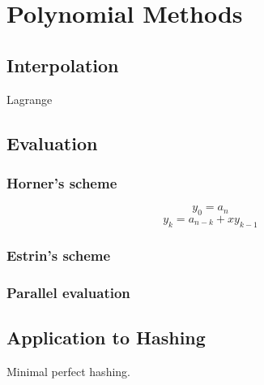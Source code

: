 
\chapter{Polynomial Methods}

\section{Interpolation}
Lagrange 
\section{Evaluation}
\subsection{Horner's scheme}
\[y_0 = a_n\]
\[y_k = a_{n-k}+xy_{k-1}\]
\subsection{Estrin's scheme}
\subsection{Parallel evaluation}
\section{Application to Hashing}
Minimal perfect hashing.
